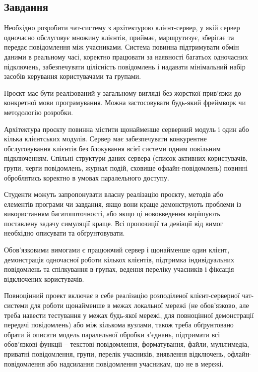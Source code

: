 \documentclass[14pt, a4paper]{extreport}
\begin{document}
	\subsection*{Завдання}
	
	Необхідно розробити чат-систему з архітектурою клієнт-сервер, у якій сервер одночасно обслуговує множину клієнтів, приймає, маршрутизує, зберігає та передає повідомлення між учасниками. Система повинна підтримувати обмін даними в реальному часі, коректно працювати за наявності багатьох одночасних підключень, забезпечувати цілісність повідомлень і надавати мінімальний набір засобів керування користувачами та групами.
	
	Проєкт має бути реалізований у загальному вигляді без жорсткої прив'язки до конкретної мови програмування. Можна застосовувати будь-який фреймворк чи методологію розробки.
	
	Архітектура проєкту повинна містити щонайменше серверний модуль і один або кілька клієнтських модулів. Сервер має забезпечувати конкурентне обслуговування клієнтів без блокування всієї системи одним повільним підключенням. ​Спільні структури даних сервера (список активних користувачів, групи, черги повідомлень, журнал подій, сховище офлайн-повідомлень) повинні оброблятись коректно в умовах паралельного доступу.
	
	Студенти можуть запропонувати власну реалізацію проєкту, методів або елементів програми чи завдання, якщо вони краще демонструють проблеми із використанням багатопоточності, або якщо ці нововведення вирішують поставлену задачу симуляції краще. Всі пропозиції та девіації від вимог необхідно описувати та обґрунтовувати.
	
	Обов'язковими вимогами є працюючий сервер і щонайменше один клієнт, демонстрація одночасної роботи кількох клієнтів, підтримка індивідуальних повідомлень та спілкування в групах, ведення переліку учасників і фіксація відключених користувачів.
	
	Повноцінний проект включає в себе реалізацію розподіленої клієнт-серверної чат-системи для роботи щонайменше в межах локальної мережі (не обов'язково, але треба навести тестування у межах будь-якої мережі, для повноцінної демонстрації передачі повідомлень) або між кількома вузлами, також треба обґрунтовано обрати й описати модель паралельної обробки з'єднань, підтримати всі обов'язкові функції -- текстові повідомлення, форматування, файли, мультимедіа, приватні повідомлення, групи, перелік учасників, виявлення відключень, офлайн-повідомлення або надсилання повідомлення учасникам, що не в мережі.
	
\end{document}
